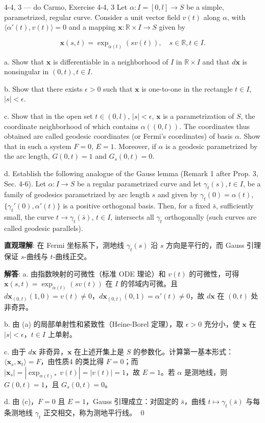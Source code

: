 \begin{exercise}{4-4, 3 — do Carmo, Exercise 4-4, 3}
Let $\alpha \colon I = [0, l] \to S$ be a simple, parametrized, regular curve. Consider a unit vector field $v(t)$ along $\alpha$, with $\langle \alpha'(t), v(t) \rangle = 0$ and a mapping $\mathbf{x} \colon \mathbb{R} \times I \to S$ given by

\[
\mathbf{x}(s, t) = \exp_{\alpha(t)}(s v(t)), \quad s \in \mathbb{R}, t \in I.
\]

a. Show that $\mathbf{x}$ is differentiable in a neighborhood of $I$ in $\mathbb{R}\times I$ and that $d\mathbf{x}$ is nonsingular in $(0,t), t\in I$.

b. Show that there exists $\epsilon > 0$ such that $\mathbf{x}$ is one-to-one in the rectangle $t \in I$, $|s| < \epsilon$.

c. Show that in the open set $t \in (0, l)$, $|s| < \epsilon$, $\mathbf{x}$ is a parametrization of $S$, the coordinate neighborhood of which contains $\alpha((0, l))$. The coordinates thus obtained are called geodesic coordinates (or Fermi's coordinates) of basis $\alpha$. Show that in such a system $F = 0$, $E = 1$. Moreover, if $\alpha$ is a geodesic parametrized by the arc length, $G(0, t) = 1$ and $G_s(0, t) = 0$.

d. Establish the following analogue of the Gauss lemma (Remark 1 after Prop. 3, Sec. 4-6). Let $\alpha \colon I \to S$ be a regular parametrized curve and let $\gamma_t(s), t \in I$, be a family of geodesics parametrized by arc length $s$ and given by $\gamma_t(0) = \alpha(t)$, $\{\gamma_t'(0), \alpha'(t)\}$ is a positive orthogonal basis. Then, for a fixed $\bar{s}$, sufficiently small, the curve $t \to \gamma_t(\bar{s})$, $t \in I$, intersects all $\gamma_t$ orthogonally (such curves are called geodesic parallels).
\end{exercise}

\begin{solution}
\textbf{直观理解}: 在 Fermi 坐标系下，测地线 $\gamma_t(s)$ 沿 $s$ 方向是平行的，而 Gauss 引理保证 $s$-曲线与 $t$-曲线正交。

\textbf{解答}: a. 由指数映射的可微性（标准 ODE 理论）和 $v(t)$ 的可微性，可得 $\mathbf{x}(s,t) = \exp_{\alpha(t)}(sv(t))$ 在 $I$ 的邻域内可微。且 $d\mathbf{x}_{(0,t)}(1,0) = v(t) \neq 0$，$d\mathbf{x}_{(0,t)}(0,1) = \alpha'(t) \neq 0$，故 $d\mathbf{x}$ 在 $(0,t)$ 处非奇异。

b. 由 (a) 的局部单射性和紧致性（Heine-Borel 定理），取 $\epsilon>0$ 充分小，使 $\mathbf{x}$ 在 $|s|<\epsilon$，$t\in I$ 上单射。

c. 由于 $d\mathbf{x}$ 非奇异，$\mathbf{x}$ 在上述开集上是 $S$ 的参数化。计算第一基本形式：$\langle\mathbf{x}_s,\mathbf{x}_t\rangle = F$，由性质4 的类比得 $F=0$；而 $|\mathbf{x}_s| = |\exp_{\alpha(t)*}v(t)| = |v(t)| = 1$，故 $E=1$。若 $\alpha$ 是测地线，则 $G(0,t)=1$，且 $G_s(0,t)=0$。

d. 由 (c)，$F=0$ 且 $E=1$，Gauss 引理成立：对固定的 $\bar{s}$，曲线 $t\mapsto\gamma_t(\bar{s})$ 与每条测地线 $\gamma_t$ 正交相交，称为测地平行线。
\qed
\end{solution}

